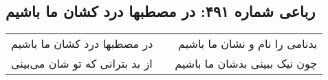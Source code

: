 \begin{center}
\section*{رباعی شماره ۴۹۱: در مصطبها درد کشان ما باشیم}
\label{sec:sh491}
\begin{longtable}{l p{0.5cm} r}
در مصطبها درد کشان ما باشیم
&&
بدنامی را نام و نشان ما باشیم
\\
از بد بترانی که تو شان می‌بینی
&&
چون نیک ببینی بدشان ما باشیم
\\
\end{longtable}
\end{center}
